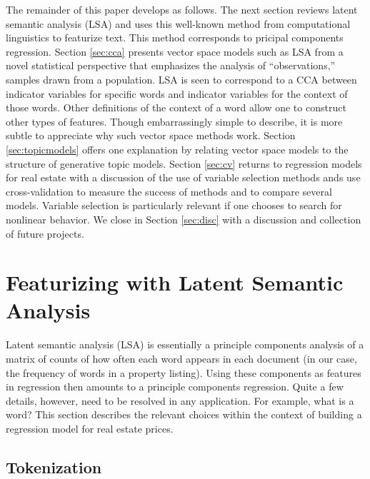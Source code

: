 \documentclass[10pt]{article}
\begin{document}
 The remainder of this paper develops as follows.  The next section reviews
 latent semantic analysis (LSA) and uses this well-known method from
 computational linguistics to featurize text.  This method corresponds to
 pricipal components regression.  Section \ref{sec:cca} presents vector space
 models such as LSA from a novel statistical perspective that emphasizes the
 analysis of ``observations,'' samples drawn from a population.  LSA is seen to
 correspond to a CCA between indicator variables for specific words and
 indicator variables for the context of those words.  Other definitions of the
 context of a word allow one to construct other types of features.  Though
 embarrassingly simple to describe, it is more subtle to appreciate why such
 vector space methods work.  Section \ref{sec:topicmodels} offers one
 explanation by relating vector space models to the structure of generative
 topic models.  Section \ref{sec:cv} returns to regression models for real
 estate with a discussion of the use of variable selection methods ands use
 cross-validation to measure the success of methods and to compare several
 models.  Variable selection is particularly relevant if one chooses to search
 for nonlinear behavior.  We close in Section \ref{sec:disc} with a discussion
 and collection of future projects.



\section{Featurizing with Latent Semantic Analysis}
\label{sec:lsa}

 Latent semantic analysis (LSA) is essentially a principle components analysis
 of a matrix of counts of how often each word appears in each document (in our
 case, the frequency of words in a property listing).  Using these components as
 features in regression then amounts to a principle components regression.
  Quite a few details, however, need to be resolved in any application. For
 example, what is a word?  This section describes the relevant choices within
 the context of building a regression model for real estate prices.
 
 \subsection{ Tokenization }  %
\end{document}
